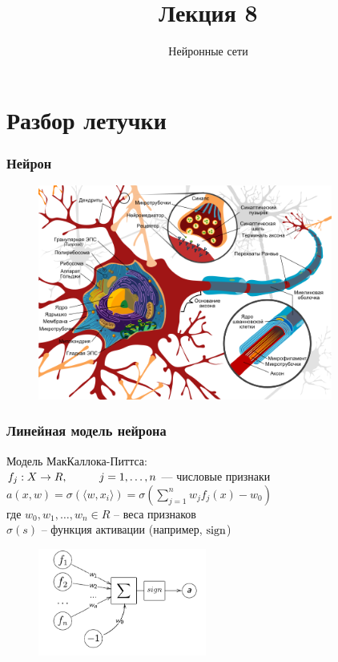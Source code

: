 \documentclass[10pt]{beamer}
\title{Лекция 8}
\subtitle{Нейронные сети}
\begin{document}
	

\section{Разбор летучки}

\frame{\titlepage}


\begin{frame}\frametitle{Нейрон}
\begin{figure}[htbp]
  \includegraphics[height=200pt, keepaspectratio = true]{images/neuron}   
\end{figure}

\end{frame}


\begin{frame}\frametitle{Линейная модель нейрона}
Модель МакКаллока-Питтса:\\
$f_j: X \rightarrow R, \hspace{10mm} j = 1,\dots, n$ — числовые признаки\\
$a(x,w) = \sigma(\langle w, x_i \rangle) = \sigma(\sum\limits_{j=1}^n w_j f_j(x) - w_0)$\\
где $w_0, w_1, \dots,w_n \in R$ -- веса признаков\\
$\sigma(s)$ -- функция активации (например, $\operatorname{sign}$)

\begin{figure}[htbp]
  \includegraphics[height=100pt, keepaspectratio = true]{images/neuron-scheme}   
\end{figure}

\end{frame}
\end{document}

